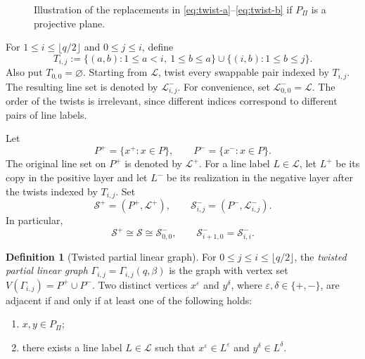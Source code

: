 \documentclass[reqno,a4paper,11pt]{article}
\theoremstyle{definition}
\newtheorem{de}[thm]{Definition}
\theoremstyle{remark}
\begin{document}
\begin{figure}[H]
	\caption{Illustration of the replacements in \eqref{eq:twist-a}--\eqref{eq:twist-b} if $P_\Pi$ is a projective plane.}
	\label{fig:swap-segment-color pp}
\end{figure}


For $1\le i\le \lfloor q/2\rfloor$ and $0\le j\le i$, define
\[
T_{i,j}:=
\{(a,b):1\le a<i,\ 1\le b\le a\}
\cup
\{(i,b):1\le b\le j\}.
\]
Also put $T_{0,0}=\varnothing$.
Starting from $\mathcal L$, twist every swappable pair indexed by $T_{i,j}$.
The resulting line set is denoted by $\mathcal L^-_{i,j}$.
For convenience, set $\mathcal L^-_{0,0}=\mathcal L$.
The order of the twists is irrelevant, since different indices correspond to different pairs of line labels.

Let
\[
P^+=\{x^+:x\in P\},\qquad P^-=\{x^-:x\in P\}.
\]
The original line set on $P^+$ is denoted by $\mathcal L^+$.
For a line label $L\in\mathcal L$, let $L^+$ be its copy in the positive layer and let $L^-$ be its realization in the negative layer after the twists indexed by $T_{i,j}$.
Set
\[
\mathcal S^+=(P^+,\mathcal L^+),\qquad
\mathcal S^-_{i,j}=(P^-,\mathcal L^-_{i,j}).
\]
In particular, 
\[
\mathcal S^+\cong \mathcal{S}\cong\mathcal S^-_{0,0},\qquad
\mathcal S^-_{i+1,0}=\mathcal{S}_{i,i}^-.
\]

\begin{de}[Twisted partial linear graph]\label{def:tpl}
For $0\le j\le i\le \lfloor q/2\rfloor$, the \emph{twisted partial linear graph}
$\Gamma_{i,j}=\Gamma_{i,j}(q,\beta)$
is the graph with vertex set
$V(\Gamma_{i,j})=P^+\cup P^-.$
Two distinct vertices $x^\varepsilon$ and $y^\delta$, where $\varepsilon,\delta\in\{+,-\}$, are adjacent if and only if at least one of the following holds:
\begin{enumerate}[label=(\roman*)]
\item $x,y\in P_\Pi$;
\item there exists a line label $L\in\mathcal L$ such that
$x^\varepsilon\in L^\varepsilon$ and $ y^\delta\in L^\delta$.
\end{enumerate}
\end{de}
\end{document}
